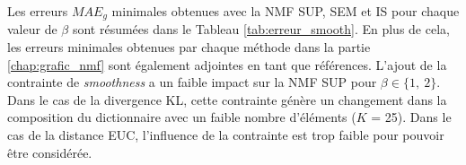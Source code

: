 \begin{table}[h!]
\centering
\caption{Erreurs $MAE_{60}$ pour les combinaisons optimales de modalités des estimateurs pour le corpus d'évaluation \textit{SOUR} en présence d'une pondération de régularité temporelle.}
\label{tab:erreur_smooth}
\end{table}

Les erreurs $MAE_g$ minimales obtenues avec la NMF SUP, SEM et IS pour chaque valeur de $\beta$ sont résumées dans le Tableau \ref{tab:erreur_smooth}. En plus de cela, les erreurs minimales obtenues par chaque méthode dans la partie \ref{chap:grafic_nmf} sont également adjointes en tant que références.
L'ajout de la contrainte de \textit{smoothness} a un faible impact sur la NMF SUP pour $\beta \in \lbrace 1,~2 \rbrace$. Dans le cas de la divergence KL, cette contrainte génère un changement dans la composition du dictionnaire avec un faible nombre d'éléments ($K$ = 25). Dans le cas de la distance EUC, l'influence de la contrainte est trop faible pour pouvoir être considérée.

